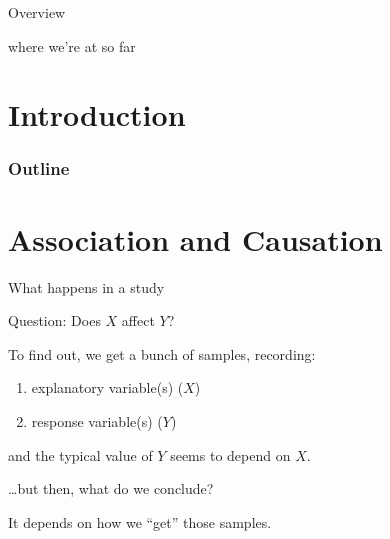 
\subtitle{and One--sided $t$-tests}

\date{17 October 2013}




\begin{frame}
  \maketitle
\end{frame}

\begin{frame}{Overview}

where we're at so far

\end{frame}

\section*{Introduction}
\begin{frame}\frametitle<presentation>{Outline}
  \tableofcontents
\end{frame}


\section{Association and Causation}

\begin{frame}{What happens in a study}

    \alert{Question:} Does $X$ affect $Y$?

    \vspace{2em}

    To find out, we get a bunch of samples, recording:
      \begin{enumerate}
          \item explanatory variable(s) ($X$)
          \item response variable(s) ($Y$)
      \end{enumerate}
    and the typical value of $Y$ seems to depend on $X$.

    \vspace{2em}

    \ldots but then, what do we conclude?

    \vspace{2em}

    \alert{It depends} on how we ``get'' those samples.

\end{frame}

